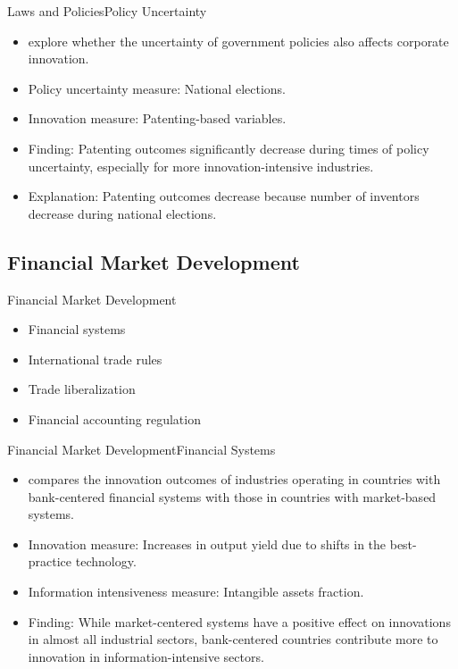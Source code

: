 \documentclass{beamer}
\begin{document}
    \begin{frame}{Laws and Policies}{Policy Uncertainty}
        \vspace{-1cm}
        \begin{itemize}
            \item \citet{BHTX2017WhatAffectsInnovation} explore whether the uncertainty of government policies also affects corporate innovation.
            \item Policy uncertainty measure: National elections.
            \item Innovation measure: Patenting-based variables.
            \item Finding: Patenting outcomes significantly decrease during times of policy uncertainty, especially for more innovation-intensive industries.
            \item Explanation: Patenting outcomes decrease because number of inventors decrease during national elections.
        \end{itemize}
    \end{frame}

    \subsection{Financial Market Development}

    \begin{frame}{Financial Market Development}
        \vspace{-1cm}
        \begin{itemize}
            \item Financial systems
            \item International trade rules
            \item Trade liberalization
            \item Financial accounting regulation
        \end{itemize}
    \end{frame}

    \begin{frame}{Financial Market Development}{Financial Systems}
        \vspace{-1cm}
        \begin{itemize}
            \item \citet{T2006InnovationInformationFinancial} compares the innovation outcomes of industries operating in countries with bank-centered financial systems with those in countries with market-based systems.   
            \item Innovation measure: Increases in output yield due to shifts in the best-practice technology.
            \item Information intensiveness measure: Intangible assets fraction.
            \item Finding: While market-centered systems have a positive effect on innovations in almost all industrial sectors, bank-centered countries contribute more to innovation in information-intensive sectors.
        \end{itemize}
    \end{frame}
\end{document}
